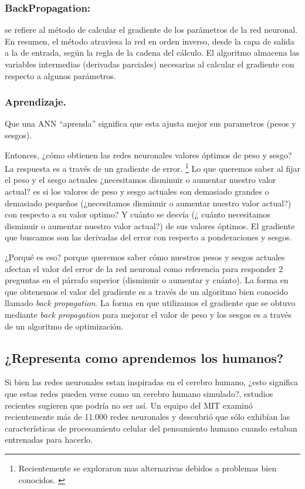 \documentclass[runningheads]{llncs} %
\begin{document}
\subsubsection{BackPropagation:}
se refiere al método de calcular el gradiente de los parámetros de la red neuronal. 
En resumen, el método atraviesa la red en orden inverso, desde la capa de salida a 
la de entrada, según la regla de la cadena del cálculo. 
El algoritmo almacena las variables intermedias (derivadas parciales) 
necesarias al calcular el gradiente con respecto a algunos parámetros.
\cite{zhang2023dive}

\subsubsection{Aprendizaje.}
Que una ANN \textquotedblleft{}aprenda\textquotedblright{} significa que
esta ajusta mejor sus parametros (pesos y sesgos).

Entonces, ¿cómo obtienen las redes neuronales valores óptimos de peso y sesgo? 
La respuesta es a través de un gradiente de error. \footnote[1]{Recientemente
se exploraron mas alternarivas debidos a problemas bien conocidos. \cite{alternativasBP}} 
Lo que queremos saber al fijar 
el peso y el sesgo actuales ¿necesitamos disminuir o aumentar nuestro valor actual?
es si los valores de peso y sesgo actuales son demasiado grandes o demasiado pequeños
(¿necesitamos disminuir o aumentar nuestro valor actual?) con respecto a su valor optimo? 
Y cuánto se desvía (¿ cuánto necesitamos disminuir o aumentar nuestro valor actual?) 
de sus valores óptimos. El gradiente que buscamos son las derivadas del error 
con respecto a ponderaciones y sesgos.\cite{backpropagation}

¿Porqué es eso? porque queremos saber cómo nuestros pesos y sesgos actuales afectan 
el valor del error de la red neuronal como referencia para responder 2 preguntas 
en el párrafo superior (disminuir o aumentar y cuánto). La forma en que obtenemos el valor 
del gradiente es a través de un algoritmo bien conocido llamado \textit{back propagation}. 
La forma en que utilizamos el gradiente que se obtuvo mediante \textit{back propagation} 
para mejorar el valor de peso y los sesgos es a través de un algoritmo de optimización.
\cite{backpropagation}

\subsection{¿Representa como aprendemos los humanos?}
Si bien las redes neuronales estan inspiradas en el cerebro humano, ¿esto significa 
que estas redes pueden verse como un cerebro humano simulado?, estudios recientes sugieren 
que podría no ser así. Un equipo del MIT examinó recientemente más de 11.000 redes neuronales 
y descubrió que sólo exhibían las características de procesamiento celular del pensamiento 
humano cuando estaban entrenadas para hacerlo. 
\end{document}
